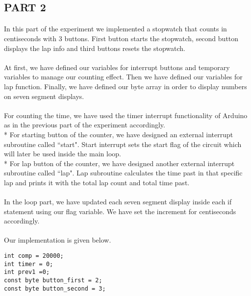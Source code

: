 \documentclass[pdftex,12pt,a4paper]{article}
\begin{document}
\begin{flushleft}
\subsection{PART 2}
\paragraph{}
In this part of the experiment we implemented a stopwatch that counts in centiseconds with 3 buttons. First button starts the stopwatch, second button displays the lap info and third buttons resets the stopwatch.
\paragraph{}
At first, we have defined our variables for interrupt buttons and temporary variables to manage our counting effect. Then we have defined our variables for lap function. Finally, we have defined our byte array in order to display numbers on seven segment displays.
\paragraph{}
For counting the time, we have used the timer interrupt functionality of Arduino as in the previous part of the experiment accordingly.\\*
For starting button of the counter, we have designed an external interrupt subroutine called ``start". Start interrupt sets the start flag of the circuit which will later be used inside the main loop.\\*
For lap button of the counter, we have designed another external interrupt subroutine called ``lap". Lap subroutine calculates the time past in that specific lap and prints it with the total lap count and total time past.
\paragraph{}
In the loop part, we have updated each seven segment display inside each if statement using our flag variable. We have set the increment for centiseconds accordingly.
\paragraph{}
Our implementation is given below.

\begin{lstlisting}[language=Arduino]
int comp = 20000;
int timer = 0;
int prev1 =0;
const byte button_first = 2;
const byte button_second = 3;


\end{lstlisting}
\end{flushleft}
\end{document}
